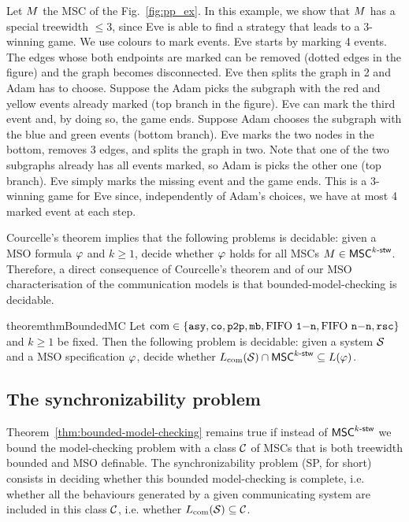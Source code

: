 \begin{example}
	Let $M$ the MSC of the Fig.~\ref{fig:pp_ex}. In this example, we show that $M$ has a special treewidth  $\le 3$, since Eve is able to find a strategy that leads to a 3-winning game.  We use colours to mark events. Eve starts by marking 4 events. The edges whose both endpoints are marked can be removed (dotted edges in the figure) and the graph becomes disconnected. Eve then splits the graph in 2 and Adam has to choose.
	Suppose the Adam picks the subgraph with the red and yellow events already marked (top branch in the figure). Eve can mark the third event and, by doing so, the game ends.
	Suppose Adam chooses the subgraph with the blue and green events (bottom branch). Eve marks the two nodes in the bottom, removes 3 edges, and splits the graph in two. Note that one of the two subgraphs already has all events marked, so Adam is picks the other one (top branch).
	Eve simply marks the missing event and the game ends. This is a 3-winning game for Eve since, independently of Adam's choices, we have at most 4 marked event at each step.
\end{example}


Courcelle's theorem implies that the following problems is
decidable: given a MSO formula $\varphi$ and $k\geq 1$,
decide whether $\varphi$ holds for all MSCs $M\in\mathsf{MSC}^{k\textup{-}\mathsf{stw}}$.
Therefore, a direct consequence of Courcelle's theorem and of our MSO characterisation
of the communication models is that bounded-model-checking is decidable.

\begin{restatable}{theorem}{thmBoundedMC}\label{thm:bounded-model-checking}
Let $\textup{com}\in\{\mathtt{asy}, \mathtt{co}, \mathtt{p2p}, \mathtt{mb}, \text{FIFO } \mathtt{1\mathsf{-}n}, \text{FIFO } \mathtt{n\mathsf{-}n}, \mathtt{rsc}\}$ and $k\geq 1$ be fixed.
Then the following problem is decidable: given a system $\mathcal{S}$ and
a MSO specification $\varphi$, decide whether
$L_{\textup{com}}(\mathcal{S})\cap \mathsf{MSC}^{k\textup{-}\mathsf{stw}}\subseteq L(\varphi)$.
\end{restatable}

\subsection{The synchronizability problem}

Theorem~\ref{thm:bounded-model-checking} remains true if instead of
$\mathsf{MSC}^{k\textup{-}\mathsf{stw}}$ we bound the model-checking problem with
a class $\mathcal{C}$ of MSCs that is both treewidth bounded and MSO definable.
The synchronizability problem (SP, for short) consists in deciding whether this bounded model-checking is complete,
i.e. whether all the behaviours generated by a given communicating system are included in this
class $\mathcal{C}$, i.e. whether
$L_{\textup{com}}(\mathcal{S}) \subseteq \mathcal{C}$.

